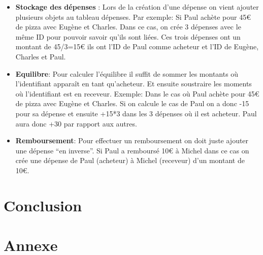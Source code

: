 \documentclass[12,french]{report}
\begin{document}
\begin{itemize}[label=\textbullet]
\item \textbf{Stockage des dépenses} : Lors de la création d’une dépense on vient ajouter plusieurs objets au tableau dépenses. Par exemple:
Si Paul achète pour 45€ de pizza avec Eugène et Charles.
Dans ce cas, on crée 3 dépenses avec le même ID pour pouvoir savoir qu’ils sont liées. Ces trois dépenses ont un montant de 45/3=15€ ils ont l’ID de Paul comme acheteur et l’ID de Eugène, Charles et Paul.\\

\item \textbf{Equilibre}:
Pour calculer l’équilibre il suffit de sommer les montants où l’identifiant apparaît en tant qu’acheteur. Et ensuite soustraire les moments où l’identifiant est en receveur.
Exemple: Dans le cas où Paul achète pour 45€ de pizza avec Eugène et Charles. Si on calcule le cas de Paul on a donc -15 pour sa dépense et ensuite +15*3 dans les 3 dépenses où il est acheteur. Paul aura donc +30 par rapport aux autres.

\item \textbf{Remboursement}:
Pour effectuer un remboursement on doit juste ajouter une dépense “en inverse”. Si Paul a remboursé 10€ à Michel dans ce cas on crée une dépense de Paul (acheteur) à Michel (receveur) d’un montant de 10€.

\end{itemize}




\chapter*{Conclusion}



\chapter*{Annexe}
\end{document}
